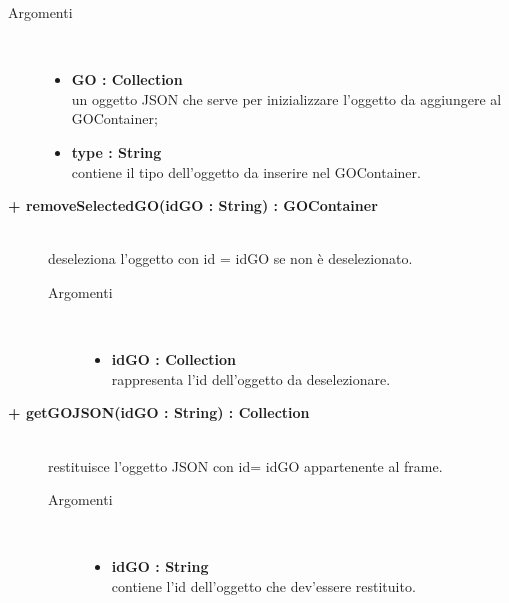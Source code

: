 \begin{description}
\begin{description}
\begin{description}
			\item[Argomenti] \hfill \\
				\begin{itemize}
						\item \textbf{GO : Collection			} \hfill \\
					un oggetto JSON che serve per inizializzare l'oggetto da aggiungere al GOContainer;
					  	\item \textbf{type : String			} \hfill \\
					  	contiene il tipo dell'oggetto da inserire nel GOContainer.
				\end{itemize}

\end{description}

\end{description}

\begin{description}
		\item[\textbf{\color{blue}+ removeSelectedGO(idGO : String) : GOContainer			}] \hfill \\
			deseleziona l'oggetto con id = idGO se non è deselezionato.  

\begin{description}
			\item[Argomenti] \hfill \\
				\begin{itemize}
						\item \textbf{idGO : Collection			} \hfill \\
					rappresenta l'id dell'oggetto da deselezionare.
				\end{itemize}

\end{description}

\end{description}

\begin{description}
		\item[\textbf{\color{blue}+ getGOJSON(idGO : String) : Collection			}] \hfill \\
			restituisce l'oggetto JSON con id= idGO appartenente al frame.   

\begin{description}
			\item[Argomenti] \hfill \\
				\begin{itemize}
						\item \textbf{idGO : String			} \hfill \\
					contiene l'id dell'oggetto che dev'essere restituito.
				\end{itemize}


\end{description}
\end{description}
\end{description}
